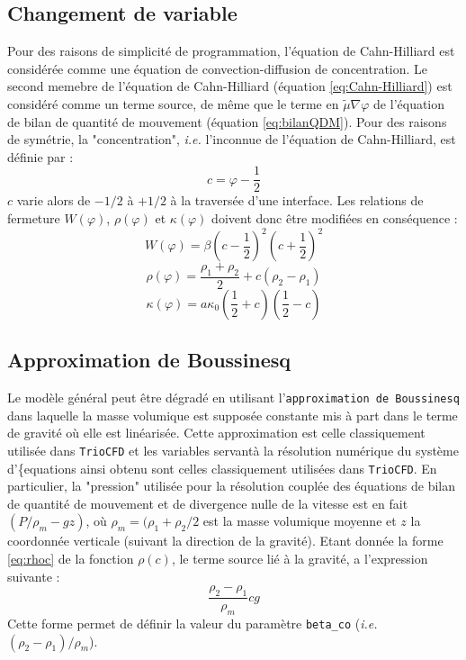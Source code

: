 \subsection{Changement de variable}
Pour des raisons de simplicit\'e de programmation, l'\'equation de Cahn-Hilliard est consid\'er\'ee comme une \'equation de convection-diffusion
de concentration. Le second memebre de l'\'equation de Cahn-Hilliard (\'equation \ref{eq:Cahn-Hilliard}) est consid\'er\'e comme un terme source,
de m\^eme que le terme en $\tilde{\mu}\nabla\varphi$ de l'\'equation de bilan de quantit\'e de mouvement (\'equation \ref{eq:bilanQDM}).\newline
Pour des raisons de sym\'etrie, la "concentration", \textit{i.e.} l'inconnue de l'\'equation de Cahn-Hilliard, est d\'efinie par :
\begin{equation}
c=\varphi-\frac{1}{2}
\end{equation}
$c$ varie alors de $-1/2$ \`a $+1/2$ \`a la travers\'ee d'une interface. Les relations de fermeture $W\left(\varphi\right)$,
$\rho\left(\varphi\right)$ et $\kappa\left(\varphi\right)$ doivent donc \^etre modifi\'ees en cons\'equence :
\begin{equation}
W\left(\varphi\right)=\beta\left(c-\frac{1}{2}\right)^2\left(c+\frac{1}{2}\right)^2
\end{equation}
\begin{equation}
\rho\left(\varphi\right)=\frac{\rho_{1}+\rho_{2}}{2}+c\left(\rho_{2}-\rho_{1}\right)\label{eq:rhoc}
\end{equation}
\begin{equation}
\kappa\left(\varphi\right)=a\kappa_{0}\left(\frac{1}{2}+c\right)\left(\frac{1}{2}-c\right)
\end{equation}

\subsection{Approximation de Boussinesq}
Le mod\`ele g\'en\'eral peut \^etre d\'egrad\'e en utilisant l'\texttt{approximation de Boussinesq} dans laquelle la masse volumique est
suppos\'ee constante mis \`a part dans le terme de gravit\'e o\`u elle est lin\'earis\'ee. Cette approximation est celle classiquement utilis\'ee
dans \texttt{TrioCFD} et les variables servant\`a la r\'esolution num\'erique du syst\`eme d'\{equations ainsi obtenu sont celles classiquement
utilis\'ees dans \texttt{TrioCFD}. En particulier, la "pression" utilis\'ee pour la r\'esolution coupl\'ee des \'equations de bilan de quantit\'e
de mouvement et de divergence nulle de la vitesse est en fait $(P/\rho_{m}-gz)$, o\`u $\rho_{m}=(\rho_{1} + \rho_{2}/2$ est la masse volumique
moyenne et $z$ la coordonn\'ee verticale (suivant la direction de la gravit\'e). Etant donn\'ee la forme \ref{eq:rhoc} de la fonction $\rho(c)$,
le terme source li\'e \`a la gravit\'e, a l'expression suivante :
\begin{equation}
\frac{\rho_{2}-\rho_{1}}{\rho_{m}} c g
\end{equation}
Cette forme permet de d\'efinir la valeur du param\`etre \texttt{beta\_co} (\textit{i.e.} $(\rho_{2}-\rho_{1})/\rho_{m}$).

